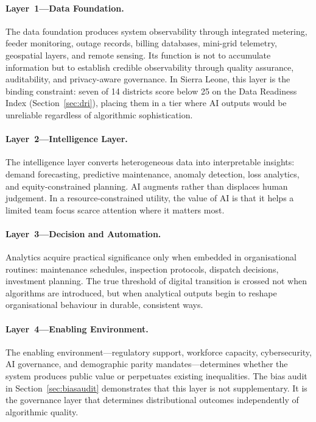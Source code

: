 \documentclass[preprint,12pt]{elsarticle}
\begin{document}
\paragraph{Layer~1---Data Foundation.}
The data foundation produces system observability through
integrated metering, feeder monitoring, outage records,
billing databases, mini-grid telemetry, geospatial layers,
and remote sensing. Its function is not to accumulate
information but to establish credible observability through
quality assurance, auditability, and privacy-aware governance.
In Sierra Leone, this layer is the binding constraint:
seven of 14 districts score below 25 on the Data Readiness
Index (Section~\ref{sec:dri}), placing them in a tier
where AI outputs would be unreliable regardless of
algorithmic sophistication.

\paragraph{Layer~2---Intelligence Layer.}
The intelligence layer converts heterogeneous data into
interpretable insights: demand forecasting, predictive
maintenance, anomaly detection, loss analytics, and
equity-constrained planning. AI augments rather than
displaces human judgement. In a resource-constrained utility,
the value of AI is that it helps a limited team focus scarce
attention where it matters most.

\paragraph{Layer~3---Decision and Automation.}
Analytics acquire practical significance only when embedded
in organisational routines: maintenance schedules, inspection
protocols, dispatch decisions, investment planning. The true
threshold of digital transition is crossed not when algorithms
are introduced, but when analytical outputs begin to reshape
organisational behaviour in durable, consistent ways.

\paragraph{Layer~4---Enabling Environment.}
The enabling environment---regulatory support, workforce
capacity, cybersecurity, AI governance, and demographic parity
mandates---determines whether the system produces public value
or perpetuates existing inequalities. The bias audit in
Section~\ref{sec:biasaudit} demonstrates that this layer is
not supplementary. It is the governance layer that determines
distributional outcomes independently of algorithmic quality.
\end{document}

